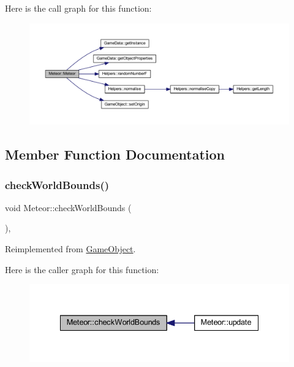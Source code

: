 Here is the call graph for this function\+:
\nopagebreak
\begin{figure}[H]
\begin{center}
\leavevmode
\includegraphics[width=350pt]{class_meteor_a70f6f6e90203c47b3529d660c178bfbb_cgraph}
\end{center}
\end{figure}


\subsection{Member Function Documentation}
\mbox{\label{class_meteor_a8cedf36b39790de3b1e9882c36428e47}} 
\subsubsection{\texorpdfstring{check\+World\+Bounds()}{checkWorldBounds()}}
{\footnotesize\ttfamily void Meteor\+::check\+World\+Bounds (\begin{DoxyParamCaption}{ }\end{DoxyParamCaption})\hspace{0.3cm}{\ttfamily [override]}, {\ttfamily [virtual]}}



Reimplemented from \hyperlink{class_game_object_a07bcaf0d87bd507f0a6e98abebd70e53}{Game\+Object}.

Here is the caller graph for this function\+:
\nopagebreak
\begin{figure}[H]
\begin{center}
\leavevmode
\includegraphics[width=335pt]{class_meteor_a8cedf36b39790de3b1e9882c36428e47_icgraph}
\end{center}
\end{figure}
\mbox{\label{class_meteor_a7fdbe8bd5027df6ae82e0d6391ec2b8d}} 
